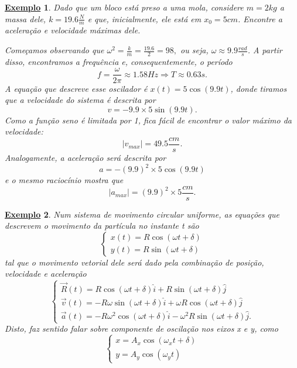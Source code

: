 \documentclass{article}
\newtheorem{example}{\underline{Exemplo}}
\begin{document}
 \begin{example}
  Dado que um bloco está preso a uma mola, considere \(m=2kg\) a massa dele, \(k = 19.6\frac{N}{m}\) e que, inicialmente,
ele está em \(x_{0} = 5cm\). Encontre a aceleração e velocidade máximas dele.

 Começamos observando que \(\omega^{2} = \frac{k}{m} = \frac{19.6}{2} = 98,\) ou seja, \(\omega \approx 9.9 \frac{rad}{s}\).
A partir disso, encontramos a frequência e, consequentemente, o período 
  \[
    f = \frac{\omega }{2\pi }\approx 1.58Hz \Rightarrow T\approx 0.63s.
  \]
  A equação que descreve esse oscilador é \(x(t) = 5\cos{(9.9t)}\), donde tiramos que a velocidade do sistema é descrita por 
  \[
    v = -9.9\times 5\sin{(9.9t)}.
  \]
  Como a função seno é limitada por 1, fica fácil de encontrar o valor máximo da velocidade: 
  \[
    |v_{max}| = 49.5 \frac{cm}{s}.
  \]
  Analogamente, a aceleração será descrita por 
  \[
    a = -(9.9)^{2}\times 5\cos{(9.9t)}
  \]
  e o mesmo raciocínio mostra que 
  \[
    |a_{max}| = (9.9)^{2}\times 5 \frac{cm}{s}.
  \]
 \end{example}
\begin{example}
  Num sistema de movimento circular uniforme, as equações que descrevem o movimento da partícula no instante t são 
    \[
       \left\{\begin{array}{ll}
          x(t) = R\cos{(\omega t + \delta )}\\
          y(t) = R\sin{(\omega t + \delta )}
        \end{array}\right.
    \] 
tal que o movimento vetorial dele será dado pela combinação de posição, velocidade e aceleração 
  \[
     \left\{\begin{array}{ll}
        \vec{R}(t) = R\cos{(\omega t + \delta )}\hat{i} + R\sin{(\omega t + \delta )}\hat{j}\\
        \vec{v}(t) = -R\omega \sin{(\omega t + \delta )}\hat{i} + \omega R\cos{(\omega t + \delta )}\hat{j}\\
        \vec{a}(t) = -R\omega ^{2}\cos{(\omega t + \delta )}\hat{i} - \omega ^{2}R\sin{(\omega t + \delta )}\hat{j}.
      \end{array}\right.
  \]
  Disto, faz sentido falar sobre componente de oscilação nos eixos x e y, como 
    \[
       \left\{\begin{array}{ll}
          x = A_{x}\cos{(\omega_{x}t + \delta )}\\
          y = A_{y}\cos{(\omega_{y}t)}
        \end{array}\right.
    \]
\end{example}
\end{document}
